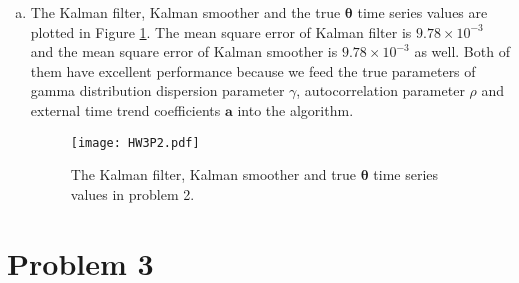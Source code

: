 \documentclass[12pt]{article}
\begin{document}
\begin{enumerate}[(a)]
	\item The Kalman filter, Kalman smoother and the true $\bm{\theta}$ time series values are plotted in Figure \ref{P2result}. The mean square error of Kalman filter is $9.78\times 10^{-3}$ and the mean square error of Kalman smoother is $9.78\times 10^{-3}$ as well. Both of them have excellent performance because we feed the true parameters of gamma distribution dispersion parameter $\gamma$, autocorrelation parameter $\rho$ and external time trend coefficients $\bm{a}$ into the algorithm.
	
	\begin{figure}[htbp]
		\centering
		\texttt{[image: HW3P2.pdf]}
		\caption{The Kalman filter, Kalman smoother and true $\bm{\theta}$ time series values in problem 2.}\label{P2result}
	\end{figure}
	
\end{enumerate}


	
\newpage

\section*{Problem 3}
\end{document}
